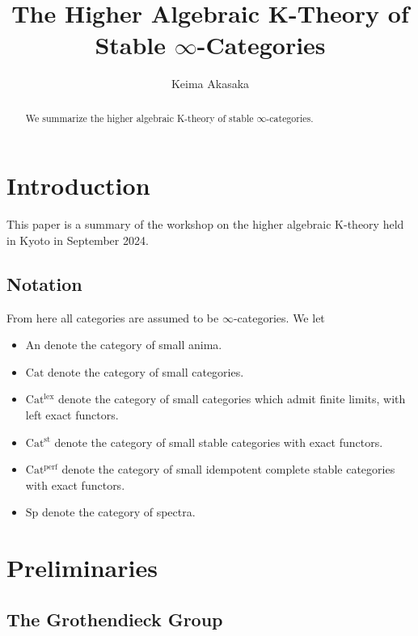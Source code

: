 \documentclass[a4paper,dvipdfmx,11pt,reqno]{amsart}
\newcommand{\An}{\mathrm{An}}
\newcommand{\Cat}{\mathrm{Cat}}
\newcommand{\Catlex}{\mathrm{Cat^{lex}}}
\newcommand{\Catperf}{\mathrm{Cat^{perf}}}
\newcommand{\Catst}{\mathrm{Cat^{st}}}
\newcommand{\Sp}{\mathrm{Sp}}
\theoremstyle{definition}
\begin{document}
\title{The Higher Algebraic K-Theory of Stable \texorpdfstring{$\infty$}{infty}-Categories}
\author{Keima Akasaka}
\maketitle 

\begin{abstract}
  We summarize the higher algebraic K-theory of stable $\infty$-categories.
\end{abstract} 

\setcounter{tocdepth}{1}
\tableofcontents   


\section{Introduction}

This paper is a summary of the workshop on the higher algebraic K-theory held in Kyoto in September 2024.

\subsection{Notation}

From here all categories are assumed to be $\infty$-categories.
We let 
\begin{itemize}
  \item $\An$ denote the category of small anima.
  \item $\Cat$ denote the category of small categories.
  \item $\Catlex$ denote the category of small categories which admit finite limits, with left exact functors.
  \item $\Catst$ denote the category of small stable categories with exact functors.
  \item $\Catperf$ denote the category of small idempotent complete stable categories with exact functors.
  \item $\Sp$ denote the category of spectra.
\end{itemize}


\section{Preliminaries} \label{sec.preliminaries}

\subsection{The Grothendieck Group} 
\end{document}
